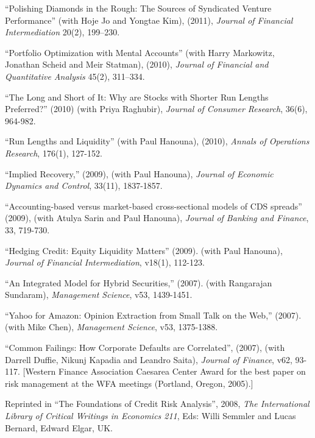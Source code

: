 \documentclass{article}
\begin{document}
\begin{etaremune}
\item ``Polishing Diamonds in the Rough: The Sources of Syndicated Venture Performance'' (with Hoje Jo and Yongtae Kim), (2011), {\it Journal of Financial Intermediation} 20(2), 199--230. 

\item ``Portfolio Optimization with Mental Accounts'' (with Harry Markowitz, Jonathan Scheid and Meir Statman), (2010), {\it Journal of Financial and Quantitative Analysis} 45(2), 311--334.

\item ``The Long and Short of It: Why are Stocks with Shorter Run Lengths Preferred?'' (2010) (with Priya Raghubir), {\it Journal of Consumer Research}, 36(6), 964-982.  


\item ``Run Lengths and Liquidity'' (with Paul Hanouna), (2010), {\it Annals of Operations Research}, 176(1), 127-152. 

\item ``Implied Recovery,'' (2009), (with Paul Hanouna), {\it Journal of Economic Dynamics and Control}, 33(11), 1837-1857. 

\item ``Accounting-based versus market-based cross-sectional models of CDS spreads'' (2009), (with Atulya Sarin and Paul Hanouna), {\it Journal of Banking and Finance}, 33, 719-730. 

\item ``Hedging Credit: Equity Liquidity Matters'' (2009). 
(with Paul Hanouna), {\it Journal of Financial Intermediation}, v18(1), 112-123.  

\item ``An Integrated Model for Hybrid Securities,'' (2007).
(with Rangarajan Sundaram), {\it Management Science}, v53, 1439-1451.

\item ``Yahoo for Amazon: Opinion Extraction from Small Talk on the Web,'' (2007). 
(with Mike Chen), {\it Management Science}, v53, 1375-1388.    

\item ``Common Failings: How Corporate Defaults are Correlated'', (2007), 
(with Darrell Duffie, Nikunj Kapadia and Leandro Saita),
{\it Journal of Finance}, v62, 93-117. [Western Finance Association Caesarea Center Award for the best paper on risk management at the WFA meetings (Portland, Oregon, 2005).]

Reprinted in ``The Foundations of Credit Risk Analysis'', 2008, {\it The International Library of Critical Writings in Economics 211}, Eds: Willi Semmler and Lucas Bernard, Edward Elgar, UK.



\end{etaremune}
\end{document}
